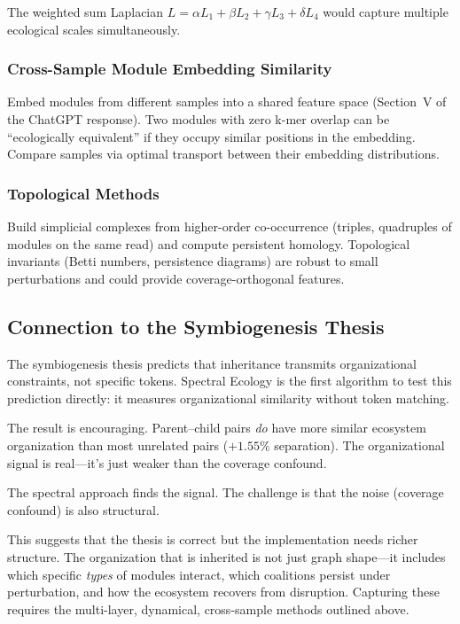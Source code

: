 \documentclass{../yalumba}
\begin{document}
The weighted sum Laplacian $L = \alpha L_1 + \beta L_2 + \gamma L_3 + \delta L_4$
would capture multiple ecological scales simultaneously.

\subsubsection{Cross-Sample Module Embedding Similarity}

Embed modules from different samples into a shared feature space (Section~V of
the ChatGPT response).  Two modules with zero k-mer overlap can be
``ecologically equivalent'' if they occupy similar positions in the embedding.
Compare samples via optimal transport between their embedding distributions.

\subsubsection{Topological Methods}

Build simplicial complexes from higher-order co-occurrence (triples, quadruples
of modules on the same read) and compute persistent homology.  Topological
invariants (Betti numbers, persistence diagrams) are robust to small
perturbations and could provide coverage-orthogonal features.

\subsection{Connection to the Symbiogenesis Thesis}

The symbiogenesis thesis predicts that inheritance transmits organizational
constraints, not specific tokens.  Spectral Ecology is the first algorithm to
test this prediction directly: it measures organizational similarity without
token matching.

The result is encouraging.  Parent--child pairs \emph{do} have more similar
ecosystem organization than most unrelated pairs ($+1.55\%$ separation).  The
organizational signal is real---it's just weaker than the coverage confound.

\begin{pullquote}
The spectral approach finds the signal. The challenge is that the noise
(coverage confound) is also structural.
\end{pullquote}

This suggests that the thesis is correct but the implementation needs richer
structure.  The organization that is inherited is not just graph shape---it
includes which specific \emph{types} of modules interact, which coalitions
persist under perturbation, and how the ecosystem recovers from disruption.
Capturing these requires the multi-layer, dynamical, cross-sample methods
outlined above.
\end{document}
